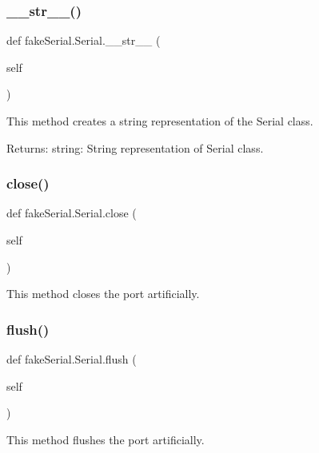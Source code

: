 \subsubsection{\texorpdfstring{\_\_str\_\_()}{\_\_str\_\_()}}
{\footnotesize\ttfamily def fake\+Serial.\+Serial.\+\_\+\+\_\+str\+\_\+\+\_\+ (\begin{DoxyParamCaption}\item[{}]{self }\end{DoxyParamCaption})}

\begin{DoxyVerb}This method creates a string representation of the Serial class.

Returns:
    string: String representation of Serial class.
\end{DoxyVerb}
 \mbox{\label{classfake_serial_1_1_serial_a183f0034571d103c4c90c041e6643557}} 
\subsubsection{\texorpdfstring{close()}{close()}}
{\footnotesize\ttfamily def fake\+Serial.\+Serial.\+close (\begin{DoxyParamCaption}\item[{}]{self }\end{DoxyParamCaption})}

\begin{DoxyVerb}This method closes the port artificially.
\end{DoxyVerb}
 \mbox{\label{classfake_serial_1_1_serial_a3c34cb0659b6d0dd5924ac79d79ad6bf}} 
\subsubsection{\texorpdfstring{flush()}{flush()}}
{\footnotesize\ttfamily def fake\+Serial.\+Serial.\+flush (\begin{DoxyParamCaption}\item[{}]{self }\end{DoxyParamCaption})}

\begin{DoxyVerb}This method flushes the port artificially.
\end{DoxyVerb}
 \mbox{\label{classfake_serial_1_1_serial_a6abb75597f64f245df8e0c7f62c7fde5}} 
